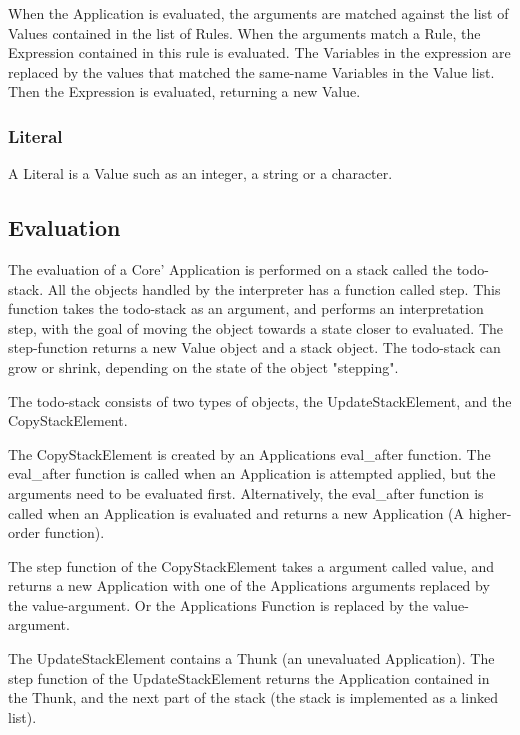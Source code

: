 When the Application is evaluated, the arguments are matched against the list of 
Values contained in the list of Rules. 
When the arguments match a Rule, the Expression contained in this rule is evaluated. 
The Variables in the expression are replaced by the values that matched the same-name
Variables in the Value list. Then the Expression is evaluated, returning a new Value.

\subsubsection{Literal}
A Literal is a Value such as an integer, a string or a character.





\subsection{Evaluation}

The evaluation of a Core' Application is performed on a stack called the
todo-stack. All the objects handled by the interpreter has a function called
step. This function takes the todo-stack as an argument, and performs an
interpretation step, with the goal of moving the object towards a state
closer to evaluated. The step-function returns a new Value object and a
stack object. The todo-stack can grow or shrink, depending on the state of
the object "stepping".

The todo-stack consists of two types of objects, the UpdateStackElement,
and the CopyStackElement. 

The CopyStackElement is created by an Applications eval\_after function. The
eval\_after function is called when an Application is attempted applied, but
the arguments need to be evaluated first. Alternatively, the eval\_after
function is called when an Application is evaluated and returns a new
Application (A higher-order function). 

The step function of the CopyStackElement takes a argument called value,
and returns a new Application with one of the Applications arguments
replaced by the value-argument. Or the Applications Function is replaced
by the value-argument.

The UpdateStackElement contains a Thunk (an unevaluated Application).
The step function of the UpdateStackElement returns the Application contained
in the Thunk, and the next part of the stack (the stack is implemented as a
linked list).

